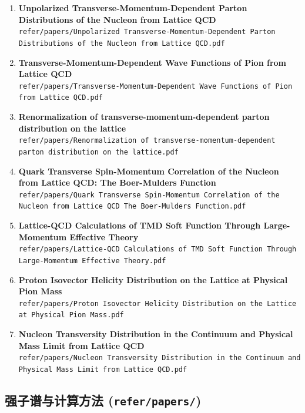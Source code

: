 \documentclass[12pt,a4paper]{ctexart}
\begin{document}
\begin{enumerate}
    \item \textbf{Unpolarized Transverse-Momentum-Dependent Parton Distributions of the Nucleon from Lattice QCD} \\
    \texttt{refer/papers/Unpolarized Transverse-Momentum-Dependent Parton Distributions of the Nucleon from Lattice QCD.pdf}

    \item \textbf{Transverse-Momentum-Dependent Wave Functions of Pion from Lattice QCD} \\
    \texttt{refer/papers/Transverse-Momentum-Dependent Wave Functions of Pion from Lattice QCD.pdf}

    \item \textbf{Renormalization of transverse-momentum-dependent parton distribution on the lattice} \\
    \texttt{refer/papers/Renormalization of transverse-momentum-dependent parton distribution on the lattice.pdf}

    \item \textbf{Quark Transverse Spin-Momentum Correlation of the Nucleon from Lattice QCD: The Boer-Mulders Function} \\
    \texttt{refer/papers/Quark Transverse Spin-Momentum Correlation of the Nucleon from Lattice QCD The Boer-Mulders Function.pdf}

    \item \textbf{Lattice-QCD Calculations of TMD Soft Function Through Large-Momentum Effective Theory} \\
    \texttt{refer/papers/Lattice-QCD Calculations of TMD Soft Function Through Large-Momentum Effective Theory.pdf}

    \item \textbf{Proton Isovector Helicity Distribution on the Lattice at Physical Pion Mass} \\
    \texttt{refer/papers/Proton Isovector Helicity Distribution on the Lattice at Physical Pion Mass.pdf}

    \item \textbf{Nucleon Transversity Distribution in the Continuum and Physical Mass Limit from Lattice QCD} \\
    \texttt{refer/papers/Nucleon Transversity Distribution in the Continuum and Physical Mass Limit from Lattice QCD.pdf}
\end{enumerate}

\subsection{强子谱与计算方法 (\texttt{refer/papers/})}
\end{document}
